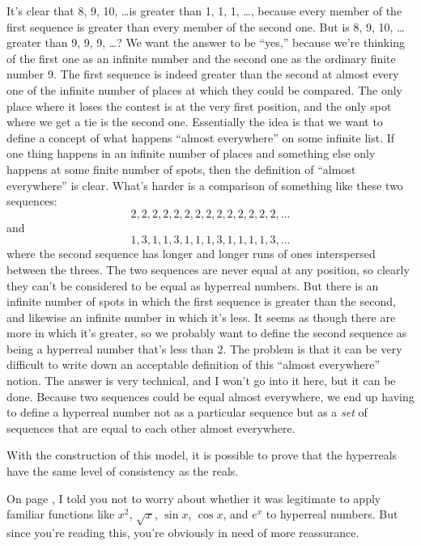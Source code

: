 It's clear that 8, 9, 10, \ldots is greater than 1, 1, 1, \ldots, because
every member of the first sequence is greater than every member of the second one.
But is 8, 9, 10, \ldots greater than 9, 9, 9, \ldots? We want the answer to be ``yes,'' because
we're thinking of the first one as an infinite number and the second one as the ordinary finite
number 9. The first sequence is indeed greater than the second at almost every one of the infinite number
of places at which they could be compared. The only place where it loses the contest is at the
very first position, and the only spot where we get a tie is the second one. Essentially the idea is
that we want to define a concept of what happens ``almost everywhere'' on some infinite list.
If one thing happens in an infinite number of places and something else only happens at
some finite number of spots, then the definition of ``almost everywhere'' is clear. What's harder
is a comparison of something like these two sequences:
\begin{equation*}
  2, 2, 2, 2, 2, 2, 2, 2, 2, 2, 2, 2, 2, 2, \ldots
\end{equation*}
and
\begin{equation*}
  1, 3, 1, 1, 3, 1, 1, 1, 3, 1, 1, 1, 1, 3, \ldots
\end{equation*}
where the second sequence has longer and longer runs of ones interspersed between the threes.
The two sequences are never equal at any position, so clearly they can't be considered to be
equal as hyperreal numbers. But there is an infinite number of spots in which the first
sequence is greater than the second, and likewise an infinite number in which it's less.
It seems as though there are more in which it's greater, so we probably want to define the
second sequence as being a hyperreal number that's less than 2. The problem is that it can
be very difficult to write down an acceptable definition of this ``almost everywhere''
notion. The answer is very technical, and I won't go into it here, but it can be done.
Because two sequences could be equal almost everywhere, we end up having to define a hyperreal number not
as a particular sequence but as a \emph{set} of sequences that are equal
to each other almost everywhere.

With the construction of this model, it is possible to prove that the hyperreals have the same level
of consistency as the reals.


On page \pageref{transcendentals}, I told you not to worry about whether it was legitimate to
apply familiar functions like $x^2$, $\sqrt{x}$, $\sin x$, $\cos x$, and $e^x$ to hyperreal numbers.
But since you're reading this, you're obviously in need of more reassurance.

